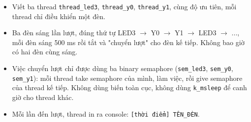 \begin{tcolorbox}[
    enhanced, colback=black!2, colframe=black!60, boxrule=1pt, arc=2.5mm, drop shadow,
    attach boxed title to top left={xshift=4mm, yshift=-3mm},
    boxed title style={enhanced, colback=black!85, colframe=black!85, boxrule=1pt, arc=2.5mm, drop shadow, left=6pt, right=6pt, top=2pt, bottom=2pt},
    title=\textcolor{white}{\large\textbf{Yêu cầu đề bài (Trích phiếu bài tập)}}
]
\bfseries
\vspace{0.2cm}
\begin{itemize}
    \item Viết ba thread \texttt{thread\_led3}, \texttt{thread\_y0}, \texttt{thread\_y1}, cùng độ ưu tiên, mỗi thread chỉ điều khiển một đèn.
    \item Ba đèn sáng lần lượt, đúng thứ tự LED3 $\rightarrow$ Y0 $\rightarrow$ Y1 $\rightarrow$ LED3 $\rightarrow$ ..., mỗi đèn sáng 500 ms rồi tắt và "chuyển lượt" cho đèn kế tiếp. Không bao giờ có hai đèn cùng sáng.
    \item Việc chuyển lượt chỉ được dùng ba binary semaphore (\texttt{sem\_led3}, \texttt{sem\_y0}, \texttt{sem\_y1}): mỗi thread take semaphore của mình, làm việc, rồi give semaphore của thread kế tiếp. Không dùng biến toàn cục, không dùng \texttt{k\_msleep} để canh giờ cho thread khác.
    \item Mỗi lần đến lượt, thread in ra console: \texttt{[thời điểm] TÊN\_ĐÈN}.
\end{itemize}
\end{tcolorbox}

\vspace{0.3cm}
